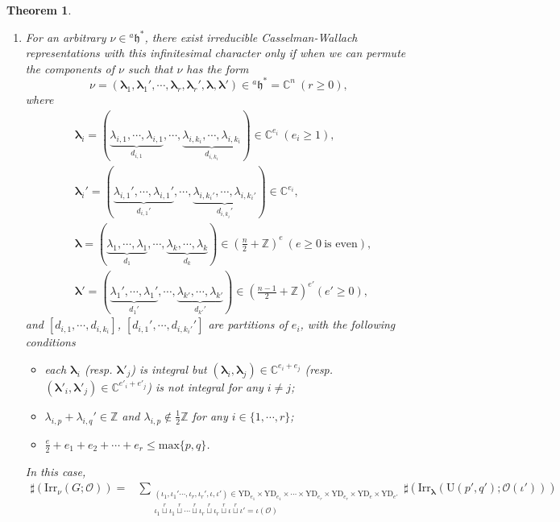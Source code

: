 \documentclass[12pt, a4paper]{amsart}
\numberwithin{equation}{section}
\newtheorem{thm}{Theorem}[section]
\newcommand{\blam}{{\boldsymbol{\lambda}}}
\newcommand{\BC}{{\mathbb {C}}}
\newcommand{\BZ}{{\mathbb {Z}}}
\newcommand{\CO}{{\mathcal {O}}}
\newcommand{\fh}{\mathfrak{h}}
\newcommand{\U}{{\mathrm{U}}}
\newcommand{\Irr}{{\mathrm{Irr}}}
\begin{document}
\begin{thm}
\begin{enumerate}
        \item For an arbitrary $\nu \in {^{a}\fh^*}$, there exist irreducible Casselman-Wallach representations with this infinitesimal character only if when we can permute the components of $\nu$ such that $\nu$ has the form
        \[
            \nu = (\blam_1, \blam_1', \cdots, \blam_r, \blam_r', \blam, \blam') \in {^{a}\fh}^* = \BC^n \ (r \geq 0),
        \]
        where 
        \begin{align} 
            &\blam_i = (\underbrace{\lambda_{i,1}, \cdots, \lambda_{i,1}}_{d_{i,1}}, \cdots, \underbrace{\lambda_{i,k_i}, \cdots, \lambda_{i,k_i}}_{d_{i,k_i}}) \in \BC^{e_i} \ (e_i \geq 1),\\
            &\blam_i' = (\underbrace{\lambda_{i,1}', \cdots, \lambda_{i,1}'}_{d_{i,1}'}, \cdots, \underbrace{\lambda_{i,k_i'}, \cdots, \lambda_{i,k_i'}}_{d_{i,k_i}'}) \in \BC^{e_i},\\
            &\blam = (\underbrace{\lambda_1, \cdots, \lambda_1}_{d_1}, \cdots, \underbrace{\lambda_k, \cdots, \lambda_k}_{d_k}) \in \left(\frac{n}{2} + \BZ\right)^{e} \ (e \geq 0 \  \textrm{is even}) ,\\
            &\blam' = (\underbrace{\lambda_1', \cdots, \lambda_1'}_{d_1'}, \cdots, \underbrace{\lambda_{k'}, \cdots, \lambda_{k'}}_{d_{k'}'}) \in \left(\frac{n-1}{2} + \BZ\right)^{e'} (e' \geq 0),
        \end{align}
        and $[d_{i,1}, \cdots, d_{i,k_i}]$, $[d_{i,1}', \cdots, d_{i,k_i'}']$ are partitions of $e_i$, with the following conditions 
        \begin{itemize}
            \item each $\blam_i$ (resp. $\blam'_j$) is integral but $(\blam_i,\blam_j) \in \BC^{e_i+e_j}$ (resp. $(\blam'_i,\blam'_j) \in \BC^{e'_i+e'_j}$) is not integral for any $i \neq j$;
            \item $\lambda_{i,p} + \lambda_{i,q}' \in \BZ$ and  $\lambda_{i,p} \notin \frac{1}{2}\BZ$ for any $i \in \{1, \cdots, r\}$;
            \item $\frac{e}{2} + e_1 + e_2 + \cdots + e_r \leq \mathrm{max}\{p,q\}$.
        \end{itemize}
        In this case, 
        \begin{align*}
            \sharp(\Irr_{\nu}(G;\CO)) = & \sum_{\substack{( \iota_1,\iota_1' \cdots,\iota_r, \iota_r',\iota, \iota') \in   \mathrm{YD}_{e_1} \times \mathrm{YD}_{e_1} \times \cdots \times \mathrm{YD}_{e_r} \times \mathrm{YD}_{e_r} \times \mathrm{YD}_{e} \times \mathrm{YD}_{e'} \\   \iota_1 \mathop{\sqcup}\limits^r \iota_1 \mathop{\sqcup}\limits^r \cdots  \mathop{\sqcup}\limits^r \iota_r \mathop{\sqcup}\limits^r \iota_r \mathop{\sqcup}\limits^r \iota \mathop{\sqcup}\limits^r \iota' = \iota(\CO)}} \sharp(\Irr_{\blam}(\U(p',q');\CO(\iota')))\\

\end{align*}
\end{enumerate}
\end{thm}
\end{document}
